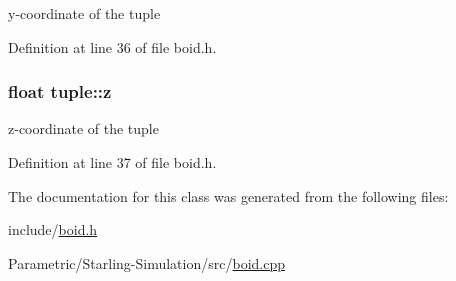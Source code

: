 y-\/coordinate of the tuple 



Definition at line 36 of file boid.\+h.

\subsubsection[{\texorpdfstring{z}{z}}]{\setlength{\rightskip}{0pt plus 5cm}float tuple\+::z}\hypertarget{classtuple_a0d96c11f0004c3682fcfdf9672d9b81d}{}\label{classtuple_a0d96c11f0004c3682fcfdf9672d9b81d}


z-\/coordinate of the tuple 



Definition at line 37 of file boid.\+h.



The documentation for this class was generated from the following files\+:\begin{DoxyCompactItemize}
\item 
include/\hyperlink{include_2boid_8h}{boid.\+h}\item 
Parametric/\+Starling-\/\+Simulation/src/\hyperlink{_parametric_2_starling-_simulation_2src_2boid_8cpp}{boid.\+cpp}\end{DoxyCompactItemize}
